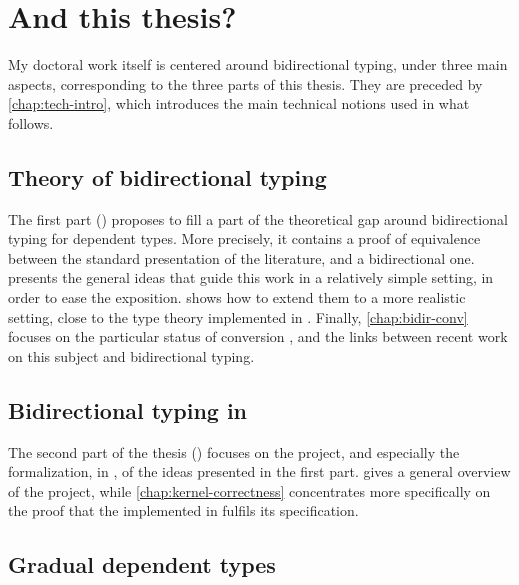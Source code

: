 \section{And this thesis?}
\label{sec:this-thesis}

My doctoral work itself is centered around bidirectional typing, under three main aspects,
corresponding to the three parts of this thesis.
They are preceded by \cref{chap:tech-intro}, which introduces the main technical notions
used in what follows.

\subsection{Theory of bidirectional typing}

The first part () proposes to fill a part of the theoretical gap around
bidirectional typing for dependent types. More precisely, it contains a proof of equivalence
between the standard presentation of the literature, and a bidirectional one.
 presents the general ideas that guide this work in a relatively
simple setting, in order to ease the exposition.  shows how to extend
them to a more realistic setting, close to the type theory implemented in .
Finally, \cref{chap:bidir-conv} focuses on the particular status of conversion%
,
and the links between recent work on this subject and bidirectional typing.

\subsection{Bidirectional typing in }

The second part of the thesis () focuses on the  project,
and especially the formalization, in , of the ideas presented in the first part.
 gives a general overview of the project, while
\cref{chap:kernel-correctness} concentrates more specifically on the proof that the
 implemented in  fulfils its specification.

\subsection{Gradual dependent types}

